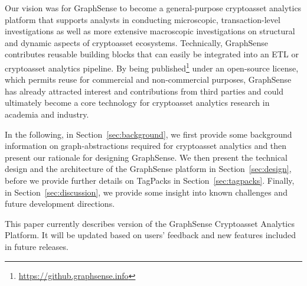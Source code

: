 Our vision was for GraphSense to become a general-purpose cryptoasset analytics platform that supports analysts in conducting microscopic, transaction-level investigations as well as more extensive macroscopic investigations on structural and dynamic aspects of cryptoasset ecosystems. Technically, GraphSense contributes reusable building blocks that can easily be integrated into an ETL or cryptoasset analytics pipeline. By being published\footnote{\url{https://github.graphsense.info}} under an open-source license, which permits reuse for commercial and non-commercial purposes, GraphSense has already attracted interest and contributions from third parties and could ultimately become a core technology for cryptoasset analytics research in academia and industry.

In the following, in Section~\ref{sec:background}, we first provide some background information on graph-abstractions required for cryptoasset analytics and then present our rationale for designing GraphSense. We then present the technical design and the architecture of the GraphSense platform in Section~\ref{sec:design}, before we provide further details on TagPacks in Section~\ref{sec:tagpacks}. Finally, in Section~\ref{sec:discussion}, we provide some insight into known challenges and future development directions.

This paper currently describes version \gsversion of the GraphSense Cryptoasset Analytics Platform. It will be updated based on users' feedback and new features included in future releases.
